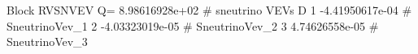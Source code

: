 Block RVSNVEV Q= 8.98616928e+02 # sneutrino VEVs D 
     1   -4.41950617e-04   # SneutrinoVev_{1}
     2   -4.03323019e-05   # SneutrinoVev_{2}
     3    4.74626558e-05   # SneutrinoVev_{3}
